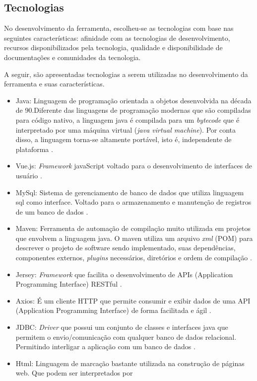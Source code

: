 \subsection{Tecnologias}

No desenvolvimento da ferramenta, escolheu-se as tecnologias com base nas seguintes características: afinidade
com as tecnologias de desenvolvimento, recursos disponibilizados pela tecnologia, qualidade e disponibilidade
de documentações e comunidades da tecnologia.

A seguir, são apresentadas tecnologias a serem utilizadas no desenvolvimento da ferramenta e suas características.

\begin{itemize}
	\item Java: Linguagem de programação orientada a objetos desenvolvida na década de 90.Diferente das linguagens de programação
		modernas que são compiladas para código nativo, a linguagem java é compilada para um \textit{bytecode} que é interpretado por uma máquina
		virtual (\textit{java virtual machine}). Por conta disso, a linguagem torna-se altamente portável, isto é, independente de plataforma \cite{java}.
	\item Vue.js: \textit{Framework} javaScript voltado para o desenvolvimento de interfaces de usuário \cite{vue}.
	\item MySql: Sistema de gerenciamento de banco de dados que utiliza linguagem sql como interface. Voltado para o armazenamento e manutenção 
		de registros de um banco de dados \cite{mysql}.
	\item Maven: Ferramenta de automação de compilação muito utilizada em projetos que envolvem a linguagem java. O maven
		utiliza um arquivo \textit{xml} (POM) para descrever o projeto de software sendo implementado, suas dependências, componentes
		externos, \textit{plugins} necessários, diretórios e ordem de compilação \cite{maven}.
	\item Jersey: \textit{Framework} que facilita o desenvolvimento de APIs (Application Programming Interface) RESTful \cite{jersey}.
	\item Axios: É um cliente HTTP que permite consumir e exibir dados de uma API (Application Programming Interface) de forma facilitada e ágil \cite{axios}.
	\item JDBC: \textit{Driver} que possui um conjunto de classes e interfaces java que permitem o envio/comunicação com qualquer
		banco de dados relacional. Permitindo interligar a aplicação com um banco de dados \cite{jdbc}.
	\item Html: Linguagem de marcação bastante utilizada na construção de páginas web. Que podem ser interpretados por 

\end{itemize}
